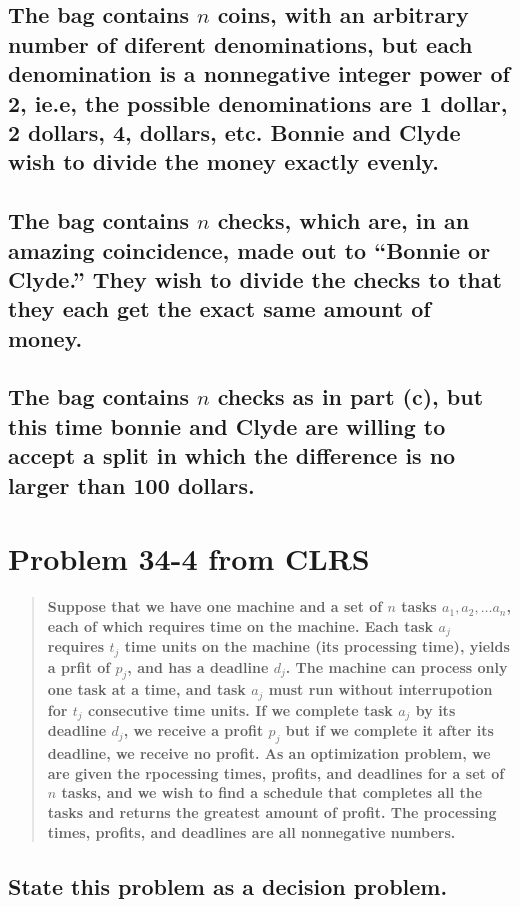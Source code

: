 \documentclass[titlepage]{article}\usepackage[]{graphicx}\usepackage[]{color}
\begin{document}
\subsection{The bag contains $n$ coins, with an arbitrary number of diferent
  denominations, but each denomination is a nonnegative integer power of 2,
  ie.e, the possible denominations are 1 dollar, 2 dollars, 4, dollars, etc.
Bonnie and Clyde wish to divide the money exactly evenly.}
\newpage


\subsection{The bag contains $n$ checks, which are, in an amazing coincidence,
  made out to ``Bonnie or Clyde.'' They wish to divide the checks to that they
each get the exact same amount of money.}
\vspace{7cm}


\subsection{The bag contains $n$ checks as in part (c), but this time bonnie
  and Clyde are willing to accept a split in which the difference is no larger
than 100 dollars.}
\newpage

\section{Problem 34-4 from CLRS}
\begin{quote} 
  \textbf{Suppose that we have one machine and a set of $n$ tasks 
    $a_1, a_2, \dots a_n$, each of which requires time on the machine. Each
  task $a_j$ requires $t_j$ time units on the machine (its processing time),
yields a prfit of $p_j$, and has a deadline $d_j$. The machine can process only
one task at a time, and task $a_j$ must run without interrupotion for $t_j$
consecutive time units. If we complete task $a_j$ by its deadline $d_j$, we
receive a profit $p_j$ but if we complete it after its deadline, we receive no
profit. As an optimization problem, we are given the rpocessing times, profits,
and deadlines for a set of $n$ tasks, and we wish to find a schedule that
completes all the tasks and returns the greatest amount of profit. The
processing times, profits, and deadlines are all nonnegative numbers.}
\end{quote}
\subsection{ State this problem as a decision problem.}
\vspace{3cm}
\end{document}
